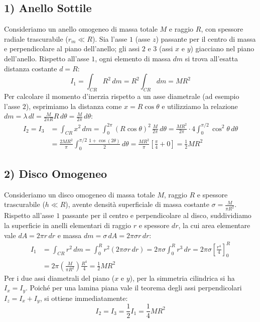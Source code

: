 \subsection{1) Anello Sottile}
Consideriamo un anello omogeneo di massa totale $M$ e raggio $R$, con spessore radiale trascurabile ($r_m \ll R$). Sia l'asse $1$ (asse $z$) passante per il centro di massa e perpendicolare al piano dell'anello; gli assi $2$ e $3$ (assi $x$ e $y$) giacciano nel piano dell'anello.
Rispetto all'asse $1$, ogni elemento di massa $dm$ si trova all'esatta distanza costante $d = R$:
\begin{equation}
    I_1 = \int_{CR} R^2 \, dm = R^2 \int_{CR} dm = M R^2
\end{equation}
Per calcolare il momento d'inerzia rispetto a un asse diametrale (ad esempio l'asse $2$), esprimiamo la distanza come $x = R\cos\theta$ e utilizziamo la relazione $dm = \lambda \, dl = \frac{M}{2\pi R} R \, d\theta = \frac{M}{2\pi} \, d\theta$:
\begin{align*}
    I_2 = I_3 &= \int_{CR} x^2 \, dm = \int_{0}^{2\pi} (R\cos\theta)^2 \, \frac{M}{2\pi} \, d\theta = \frac{M R^2}{2\pi} \cdot 4 \int_{0}^{\pi/2} \cos^2\theta \, d\theta \\
    &= \frac{2M R^2}{\pi} \int_{0}^{\pi/2} \frac{1 + \cos(2\theta)}{2} \, d\theta = \frac{M R^2}{\pi} \left[ \frac{\pi}{4} + 0 \right] = \frac{1}{2} M R^2
\end{align*}

\subsection{2) Disco Omogeneo}
Consideriamo un disco omogeneo di massa totale $M$, raggio $R$ e spessore trascurabile ($h \ll R$), avente densità superficiale di massa costante $\sigma = \frac{M}{\pi R^2}$. 
Rispetto all'asse $1$ passante per il centro e perpendicolare al disco, suddividiamo la superficie in anelli elementari di raggio $r$ e spessore $dr$, la cui area elementare vale $dA = 2\pi r \, dr$ e massa $dm = \sigma \, dA = 2\pi \sigma r \, dr$:
\begin{align*}
    I_1 &= \int_{CR} r^2 \, dm = \int_{0}^{R} r^2 (2\pi \sigma r \, dr) = 2\pi \sigma \int_{0}^{R} r^3 \, dr = 2\pi \sigma \left[ \frac{r^4}{4} \right]_0^R \\
    &= 2\pi \left( \frac{M}{\pi R^2} \right) \frac{R^4}{4} = \frac{1}{2} M R^2
\end{align*}
Per i due assi diametrali del piano ($x$ e $y$), per la simmetria cilindrica si ha $I_x = I_y$. Poiché per una lamina piana vale il teorema degli assi perpendicolari $I_z = I_x + I_y$, si ottiene immediatamente:
\begin{equation}
    I_2 = I_3 = \frac{1}{2} I_1 = \frac{1}{4} M R^2
\end{equation}

